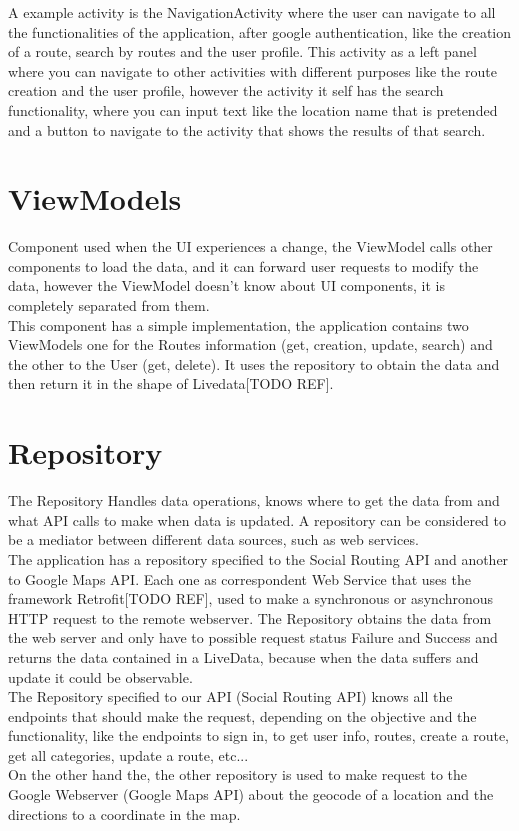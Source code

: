 A example activity is the NavigationActivity where the user can navigate to all the functionalities of the application, after google authentication, like the creation of a route, 
search by routes and the user profile. This activity as a left panel where you can navigate to other activities with different purposes like the route creation and the user profile, 
however the activity it self has the search functionality, where you can input text like the location name that is pretended and a button to navigate to the activity that shows the 
results of that search.

\section*{ViewModels}
Component used when the UI experiences a change, the ViewModel calls
other components to load the data, and it can forward user requests to
modify the data, however the ViewModel doesn't know about UI components, 
it is completely separated from them. \\
This component has a simple implementation, the application contains two ViewModels one for the Routes information (get, creation, update, search) and the other 
to the User (get, delete). It uses the repository to obtain the data and then return it in the shape of Livedata[TODO REF].

\section*{Repository}
The Repository Handles data operations, knows where to get the data from
and what API calls to make when data is updated. A repository can be
considered to be a mediator between different data sources, such as web services. \\
The application has a repository specified to the Social Routing API and another to Google Maps API. Each one as correspondent Web Service that uses the
framework Retrofit[TODO REF], used to make a synchronous or asynchronous HTTP request to the remote webserver. The Repository obtains the data
from the web server and only have to possible request status Failure and Success and returns the data contained in a LiveData, because when the data suffers
and update it could be observable. \\
The Repository specified to our API (Social Routing API) knows all the endpoints that should make the request, depending on the objective and the functionality, like 
the endpoints to sign in, to get user info, routes, create a route, get all categories, update a route, etc... \\
On the other hand the, the other repository is used to make request to the Google Webserver (Google Maps API) about the geocode of a location and the directions to a coordinate in the map. 

